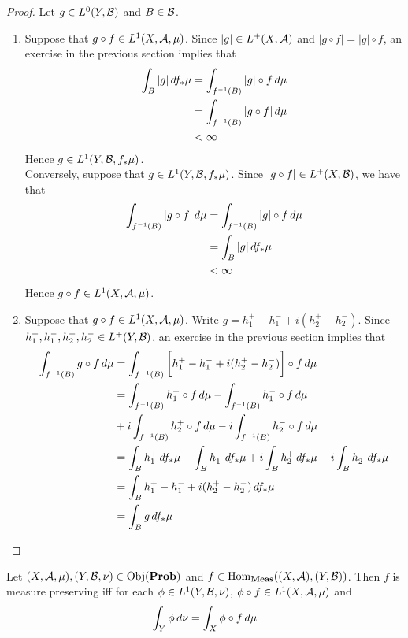 \documentclass{book}
\begin{document}
	\begin{proof} Let $g \in L^0(Y, \mathcal{B})$ and $B \in \mathcal{B}$.
		\begin{enumerate}
			\item Suppose that $g \circ f \in L^1(X, \mathcal{A}, \mu)$. Since $|g| \in L^+(X, \mathcal{A})$ and $|g \circ f| = |g| \circ f$, an exercise in the previous section implies that 
			\begin{align*}
				\int_B |g|  \, d f_*\mu  
				& = \int_{f^{-1}(B)} |g| \circ f \, d \mu \\
				& = \int_{f^{-1}(B)} |g \circ f| \, d \mu \\
				& < \infty 
			\end{align*}
			Hence $g \in L^1(Y, \mathcal{B}, f_*\mu)$. \\
			Conversely, suppose that $g \in L^1(Y, \mathcal{B}, f_*\mu)$. Since $|g \circ f| \in L^+(X, \mathcal{B})$, we have that 
			\begin{align*}
				\int_{f^{-1}(B)} |g \circ f| \, d \mu   
				& = \int_{f^{-1}(B)} |g| \circ f \, d \mu \\
				& = \int_B |g|  \, d f_*\mu \\
				& < \infty 
			\end{align*}
			Hence $g \circ f \in L^1(X, \mathcal{A}, \mu)$. \\
			\item Suppose that $g \circ f \in L^1(X, \mathcal{A}, \mu)$. Write $g = h_1^+ - h_1^- + i(h_2^+ - h_2^-)$. Since $h_1^+, h_1^-, h_2^+, h_2^- \in L^+(Y, \mathcal{B})$, an exercise in the previous section implies that 
			\begin{align*}
				\int_{f^{-1}(B)} g \circ f \, d \mu
				& = \int_{f^{-1}(B)} \bigg[ h_1^+ - h_1^- + i(h_2^+ - h_2^-) \bigg] \circ f \, d \mu \\
				& = \int_{f^{-1}(B)}  h_1^+ \circ f \, d \mu - \int_{f^{-1}(B)}  h_1^- \circ f \, d \mu \\
				& + i \int_{f^{-1}(B)} h_2^+ \circ f \, d \mu -i \int_{f^{-1}(B)}  h_2^- \circ f \, d \mu \\
				& = \int_B h_1^+ \, d f_*\mu - \int_B h_1^- \, d f_*\mu + i \int_B h_2^+ \, d f_*\mu - i \int_B h_2^- \, d f_*\mu \\
				& = \int_B  h_1^+ - h_1^- + i(h_2^+ - h_2^-)  \, d f_*\mu \\
				& = \int_B g \, d f_*\mu
			\end{align*}
		\end{enumerate}
	\end{proof}

	\begin{ex}  
		Let $(X, \mathcal{A}, \mu), (Y, \mathcal{B}, \nu) \in \operatorname{Obj}(\operatorname*{\text{\textbf{Prob}}})$ and $f \in \operatorname{Hom}_{\operatorname*{\text{\textbf{Meas}}}}((X, \mathcal{A}), (Y, \mathcal{B}))$. Then $f$ is measure preserving iff for each $\phi \in L^1(Y, \mathcal{B}, \nu)$, $\phi \circ f \in L^1(X, \mathcal{A}, \mu)$ and 
		$$\int_Y \phi \, d \nu = \int_X \phi \circ f \, d \mu $$
	\end{ex}
	
\end{document}
